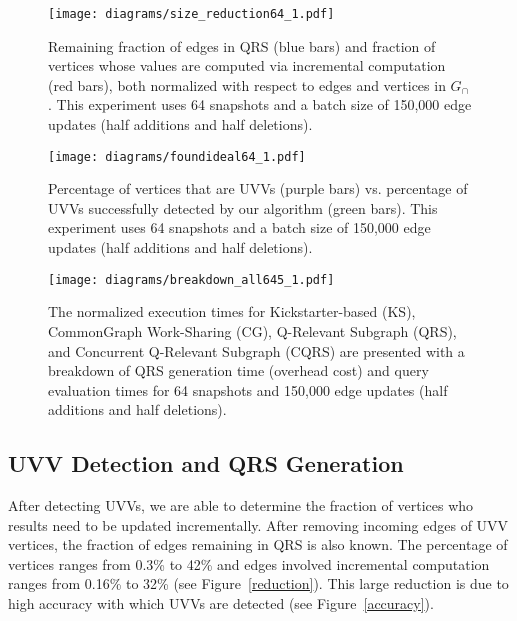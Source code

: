 \begin{figure*}[!t]
\vspace{0.05in}

    \centering
    \texttt{[image: diagrams/size\_reduction64\_1.pdf]}
    \vspace{-0.15in}
    \caption{Remaining fraction of edges in QRS (blue bars) and fraction of vertices whose values are computed via incremental computation (red bars), both normalized with respect to edges and vertices in $G_{\cap}$. This experiment uses 64 snapshots and a batch size of 150,000 edge updates (half additions and half deletions).}
    \label{reduction}

    \centering
    \texttt{[image: diagrams/foundideal64\_1.pdf]}
    \vspace{-0.15in}
    \caption{Percentage of vertices that are UVVs (purple bars) vs. percentage of UVVs successfully detected by our algorithm (green bars). This experiment uses 64 snapshots and a batch size of 150,000 edge updates (half additions and half deletions).}
    \label{accuracy}

    \centering  
    \texttt{[image: diagrams/breakdown\_all645\_1.pdf]}
    \vspace{-0.1in}
    \caption{The normalized execution times for Kickstarter-based (KS), CommonGraph Work-Sharing (CG), Q-Relevant Subgraph (QRS), and Concurrent Q-Relevant Subgraph (CQRS) are presented with a breakdown of QRS generation time (overhead cost) and query evaluation times for 64 snapshots and 150,000 edge updates (half additions and half deletions).}
    \label{overhead}
    \vspace{-0.15in}  
\end{figure*}




\subsection{UVV Detection and QRS Generation}
After detecting UVVs, we are able to determine the fraction of vertices who results need to be updated incrementally. After removing incoming edges of UVV vertices, the fraction of edges remaining in QRS is also known. The percentage of vertices ranges from 0.3\% to 42\% and edges involved incremental computation ranges from 0.16\% to 32\% (see Figure~\ref{reduction}). This large reduction is due to high accuracy with which UVVs are detected (see Figure~\ref{accuracy}).

